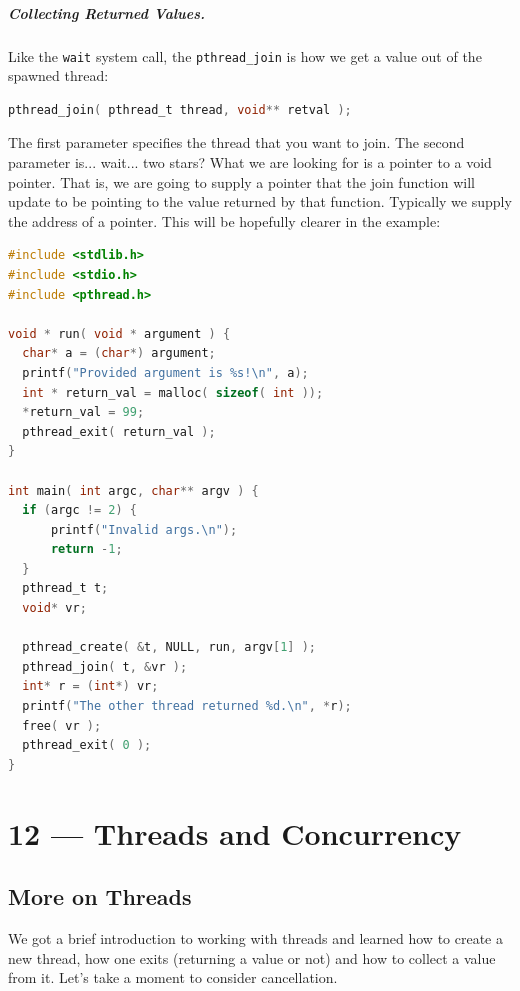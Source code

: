 \documentclass[a4paper]{report}
\begin{document}
\paragraph{Collecting Returned Values.} Like the \texttt{wait} system call, the \texttt{pthread\_join} is how we get a value out of the spawned thread:

\begin{lstlisting}[language=C]
pthread_join( pthread_t thread, void** retval );
\end{lstlisting}

The first parameter specifies the thread that you want to join. The second parameter is... wait... two stars? What we are looking for is a pointer to a void pointer. That is, we are going to supply a pointer that the join function will update to be pointing to the value returned by that function. Typically we supply the address of a pointer. This will be hopefully clearer in the example:

\begin{lstlisting}[language=C]
#include <stdlib.h>
#include <stdio.h>
#include <pthread.h>

void * run( void * argument ) { 
  char* a = (char*) argument;
  printf("Provided argument is %s!\n", a); 
  int * return_val = malloc( sizeof( int )); 
  *return_val = 99; 
  pthread_exit( return_val );
}

int main( int argc, char** argv ) { 
  if (argc != 2) {
      printf("Invalid args.\n");
      return -1; 
  }
  pthread_t t;
  void* vr; 
  
  pthread_create( &t, NULL, run, argv[1] );
  pthread_join( t, &vr );
  int* r = (int*) vr; 
  printf("The other thread returned %d.\n", *r);
  free( vr );
  pthread_exit( 0 );
}
\end{lstlisting}








\chapter*{12 --- Threads and Concurrency}


\section*{More on Threads}

We got a brief introduction to working with threads and learned how to create a new thread, how one exits (returning a value or not) and how to collect a value from it. Let's take a moment to consider cancellation.
\end{document}
